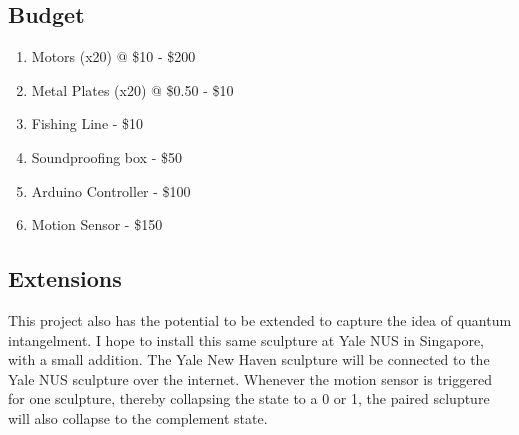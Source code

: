 \subsection{Budget}

\begin{enumerate}
\item Motors (x20) @ \$10 - \$200
\item Metal Plates (x20) @ \$0.50 - \$10
\item Fishing Line - \$10
\item Soundproofing box - \$50
\item Arduino Controller - \$100
\item Motion Sensor - \$150
\end{enumerate}

\subsection{Extensions}

This project also has the potential to be extended to capture the idea of quantum intangelment.
I hope to install this same sculpture at Yale NUS in Singapore, with a small addition.
The Yale New Haven sculpture will be connected to the Yale NUS sculpture over the internet.
Whenever the motion sensor is triggered for one sculpture, thereby collapsing the state to a 0 or 1, the paired sclupture will also collapse to the complement state.


